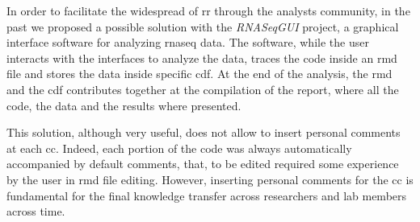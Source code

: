 In order to facilitate the widespread of \gls{rr} through the analysts community, in the past we proposed a possible solution with the \textit{RNASeqGUI} \cite{russo2015advantages} project, a graphical interface software for analyzing \gls{rnaseq} data.
The software, while the user interacts with the interfaces to analyze the data, traces the code inside an \gls{rmd} file and stores the data inside specific \gls{cdf}.
At the end of the analysis, the \gls{rmd} and the \gls{cdf} contributes together at the compilation of the report, where all the code, the data and the results where presented.

This solution, although very useful, does not allow to insert personal comments at each \gls{cc}.
Indeed, each portion of the code was always automatically accompanied by default comments, that, to be edited required some experience by the user in \gls{rmd} file editing.
However, inserting personal comments for the \gls{cc} is fundamental for the final knowledge transfer across researchers and lab members across time.


